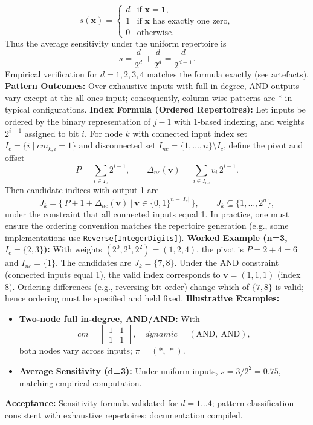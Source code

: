 \[
s(\mathbf{x}) = \begin{cases}
 d & \text{if } \mathbf{x}=\mathbf{1},\\
 1 & \text{if } \mathbf{x} \text{ has exactly one zero},\\
 0 & \text{otherwise.}
\end{cases}
\]
Thus the average sensitivity under the uniform repertoire is
\[
\bar{s} = \frac{d}{2^d} + \frac{d}{2^d} = \frac{d}{2^{d-1}}.
\]
Empirical verification for \(d=1,2,3,4\) matches the formula exactly (see artefacts).
\textbf{Pattern Outcomes:} Over exhaustive inputs with full in-degree, AND outputs vary except at the all-ones input; consequently, column-wise patterns are \(*\) in typical configurations.
\textbf{Index Formula (Ordered Repertoires):} Let inputs be ordered by the binary representation of \(j-1\) with 1-based indexing, and weights \(2^{i-1}\) assigned to bit \(i\). For node \(k\) with connected input index set \(I_c=\{i\mid cm_{k,i}=1\}\) and disconnected set \(I_{nc}=\{1,\dots,n\}\setminus I_c\), define the pivot and offset
\[
P=\sum_{i\in I_c}2^{i-1},\qquad \Delta_{nc}(\mathbf{v})=\sum_{i\in I_{nc}} v_i\,2^{i-1}.
\]
Then candidate indices with output 1 are
\[
J_k=\big\{\,P+1+\Delta_{nc}(\mathbf{v})\ \big|\ \mathbf{v}\in\{0,1\}^{n-\lvert I_c\rvert}\,\big\},\qquad J_k\subseteq\{1,\dots,2^n\},
\]
under the constraint that all connected inputs equal 1. In practice, one must ensure the ordering convention matches the repertoire generation (e.g., some implementations use \texttt{Reverse[IntegerDigits]}).
\textbf{Worked Example (n=3, \(I_c=\{2,3\}\)):} With weights \((2^{0},2^{1},2^{2})=(1,2,4)\), the pivot is \(P=2+4=6\) and \(I_{nc}=\{1\}\). The candidates are \(J_k=\{7,8\}\). Under the AND constraint (connected inputs equal 1), the valid index corresponds to \(\mathbf{v}=(1,1,1)\) (index 8). Ordering differences (e.g., reversing bit order) change which of \(\{7,8\}\) is valid; hence ordering must be specified and held fixed.
\textbf{Illustrative Examples:}
\begin{itemize}
\item \textbf{Two-node full in-degree, AND/AND:} With
\[
cm = \begin{bmatrix}1 & 1\\ 1 & 1\end{bmatrix},\quad dynamic=(\text{AND},\ \text{AND}),
\]
both nodes vary across inputs; \(\pi=(*,\ *)\).
\item \textbf{Average Sensitivity (d=3):} Under uniform inputs, \(\bar{s}=3/2^{2}=0.75\), matching empirical computation.
\end{itemize}
\textbf{Acceptance:} Sensitivity formula validated for \(d=1\dots 4\); pattern classification consistent with exhaustive repertoires; documentation compiled.


